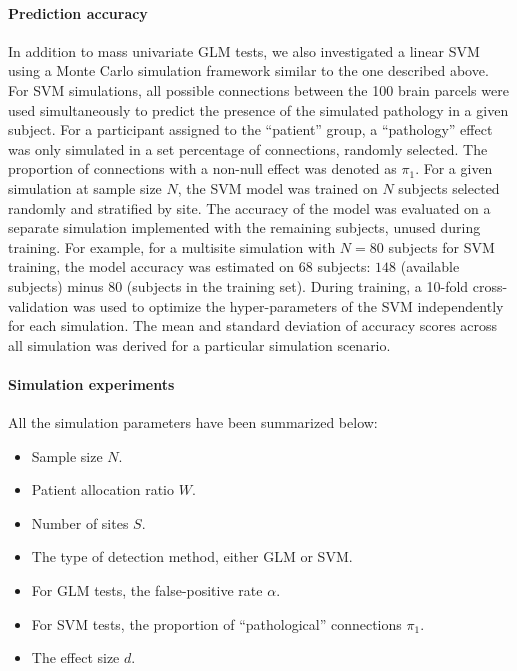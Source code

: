 \documentclass[authoryear]{elsarticle}
\begin{document}

\paragraph{Prediction accuracy}
In addition to mass univariate GLM tests, we also investigated a linear SVM \citep{Cortes1995} using a Monte Carlo simulation framework similar to the one described above. For SVM simulations, all possible connections between the 100 brain parcels were used simultaneously to predict the presence of the simulated pathology in a given subject. For a participant assigned to the ``patient'' group, a ``pathology'' effect was only simulated in a set percentage of connections, randomly selected. The proportion of connections with a non-null effect was denoted as $\pi_1$. For a given simulation at sample size $N$, the SVM model was trained on $N$ subjects selected randomly and stratified by site. The accuracy of the model was evaluated on a separate simulation implemented with the remaining subjects, unused during training. For example, for a multisite simulation with $N=80$ subjects for SVM training, the model accuracy was estimated on $68$ subjects: $148$ (available subjects) minus $80$ (subjects in the training set). During training, a 10-fold cross-validation was used to optimize the hyper-parameters of the SVM independently for each simulation. The mean and standard deviation of accuracy scores across all simulation was derived for a particular simulation scenario.

\paragraph{Simulation experiments}

All the simulation parameters have been summarized below: 
\begin{itemize}
 \item Sample size $N$. 
 \item Patient allocation ratio $W$. 
 \item Number of sites $S$. 
 \item The type of detection method, either GLM or SVM. 
 \item For GLM tests, the false-positive rate $\alpha$. 
 \item For SVM tests, the proportion of ``pathological'' connections $\pi_1$.
 \item The effect size $d$. 
\end{itemize}
\end{document}
